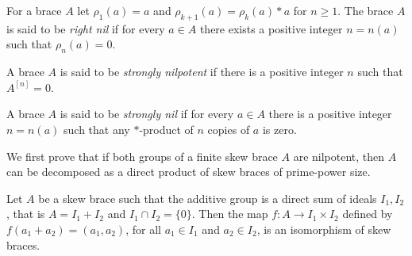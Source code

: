 \begin{definition}
For a brace $A$ let $\rho_1(a)=a$ and $\rho_{k+1}(a)=\rho_k(a)*a$ for
$n\geq1$.  The brace $A$ is said to be \emph{right nil} if for every $a\in A$ there
exists a positive integer $n=n(a)$ such that $\rho_n(a)=0$. 
\end{definition}



\begin{definition}
A brace $A$ is said to be \emph{strongly nilpotent}
if there is a positive integer $n$ such that $A^{[n]}=0$.
\end{definition}

\begin{definition}
    A brace $A$ is said to be \emph{strongly nil} if for every
    $a\in A$ there is a positive integer $n=n(a)$ such that any $*$-product of
    $n$ copies of $a$ is zero.
\end{definition}


%
%

We first prove that if both groups of a finite skew brace $A$ are
nilpotent, then $A$ can be decomposed as a direct product of skew braces
of prime-power size. 

\begin{lemma}
\label{sum}
    Let $A$ be a skew brace such that the additive
group is a direct sum of ideals $I_1,I_2$, that is $A=I_1+I_2$ and
$I_1\cap I_2=\{0\}$. Then the map $f:A\rightarrow I_1\times I_2$
defined by $f(a_1+a_2)=(a_1,a_2)$, for all $a_1\in I_1$ and $a_2\in
I_2$, is an isomorphism of skew braces.
\end{lemma}


